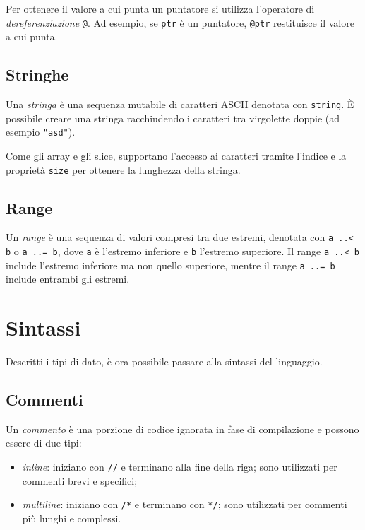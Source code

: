 Per ottenere il valore a cui punta un puntatore si utilizza l'operatore di \emph{dereferenziazione} \texttt{@}. Ad esempio, se \texttt{ptr} \`e un puntatore, \texttt{@ptr} restituisce il valore a cui punta.

\subsection{Stringhe}
\label{ssec:stringhe}

Una \emph{stringa} \`e una sequenza mutabile di caratteri ASCII denotata con \texttt{string}. \`E possibile creare una stringa racchiudendo i caratteri tra virgolette doppie (ad esempio \texttt{"asd"}).

Come gli array e gli slice, supportano l'accesso ai caratteri tramite l'indice e la propriet\`a \texttt{size} per ottenere la lunghezza della stringa.

\subsection{Range}
\label{ssec:range}

Un \emph{range} \`e una sequenza di valori compresi tra due estremi, denotata con \texttt{a ..< b} o \texttt{a ..= b}, dove \texttt{a} \`e l'estremo inferiore e \texttt{b} l'estremo superiore. Il range \texttt{a ..< b} include l'estremo inferiore ma non quello superiore, mentre il range \texttt{a ..= b} include entrambi gli estremi.

\section{Sintassi}
\label{sec:sintassi}

Descritti i tipi di dato, \`e ora possibile passare alla sintassi del linguaggio.

\subsection{Commenti}
\label{ssec:commenti}

Un \emph{commento} \`e una porzione di codice ignorata in fase di compilazione e possono essere di due tipi:
\begin{itemize}
	\item \emph{inline}: iniziano con \texttt{//} e terminano alla fine della riga; sono utilizzati per commenti brevi e specifici;
	\item \emph{multiline}: iniziano con \texttt{/*} e terminano con \texttt{*/}; sono utilizzati per commenti pi\`u lunghi e complessi.
\end{itemize}

